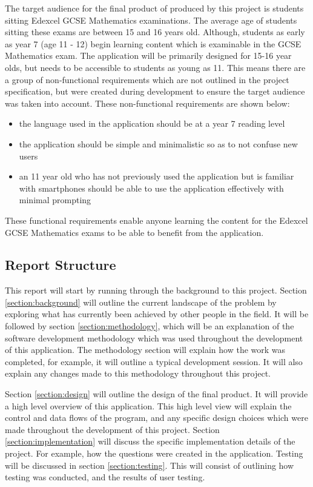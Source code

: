 \documentclass{article}
\begin{document}
The target audience for the final product of produced by this project is students sitting Edexcel GCSE Mathematics examinations. The average age of students sitting these exams are between 15 and 16 years old. Although, students as early as year 7 (age 11 - 12) begin learning content which is examinable in the GCSE Mathematics exam. The application will be primarily designed for 15-16 year olds, but needs to be accessible to students as young as 11. This means there are a group of non-functional requirements which are not outlined in the project specification, but were created during development to ensure the target audience was taken into account. These non-functional requirements are shown below:

\begin{itemize}
	\item the language used in the application should be at a year 7 reading level
	\item the application should be simple and minimalistic so as to not confuse new users
	\item an 11 year old who has not previously used the application but is familiar with smartphones should be able to use the application effectively with minimal prompting
\end{itemize}

These functional requirements enable anyone learning the content for the Edexcel GCSE Mathematics exams to be able to benefit from the application.

\subsection{Report Structure}

This report will start by running through the background to this project. Section \ref{section:background} will outline the current landscape of the problem by exploring what has currently been achieved by other people in the field. It will be followed by section \ref{section:methodology}, which will be an explanation of the software development methodology which was used throughout the development of this application. The methodology section will explain how the work was completed, for example, it will outline a typical development session. It will also explain any changes made to this methodology throughout this project. \par

Section \ref{section:design} will outline the design of the final product. It will provide a high level overview of this application. This high level view will explain the control and data flows of the program, and any specific design choices which were made throughout the development of this project. Section \ref{section:implementation} will discuss the specific implementation details of the project. For example, how the questions were created in the application. Testing will be discussed in section \ref{section:testing}. This will consist of outlining how testing was conducted, and the results of user testing. \par
\end{document}
